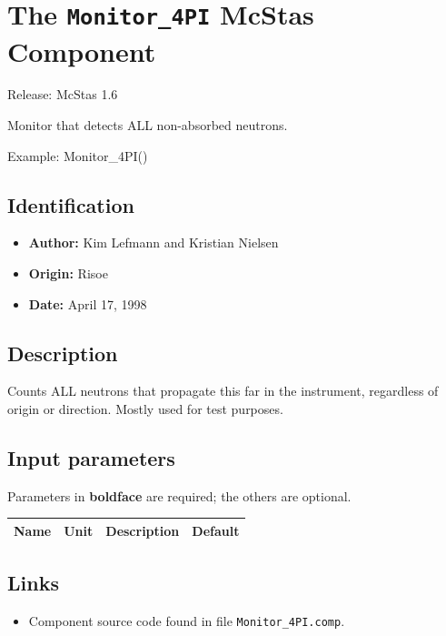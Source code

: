 \section{The \texttt{Monitor\_4PI} McStas Component}
Release: McStas 1.6

Monitor that detects ALL non-absorbed neutrons.

Example: Monitor\_4PI()

\subsection*{Identification}
\begin{itemize}
  \item \textbf{Author:} Kim Lefmann and Kristian Nielsen
  \item \textbf{Origin:} Risoe
  \item \textbf{Date:} April 17, 1998
\end{itemize}

\subsection*{Description}
Counts ALL neutrons that propagate this far in the instrument, regardless of origin or direction. Mostly used for test purposes.

\subsection*{Input parameters}
Parameters in \textbf{boldface} are required; the others are optional.

\begin{longtable}{p{}p{}p{}p{}}
\toprule
\textbf{Name} & \textbf{Unit} & \textbf{Description} & \textbf{Default} \\
\midrule
\endhead
\bottomrule
\end{longtable}

\subsection*{Links}
\begin{itemize}
  \item Component source code found in file \texttt{Monitor\_4PI.comp}.
\end{itemize}
